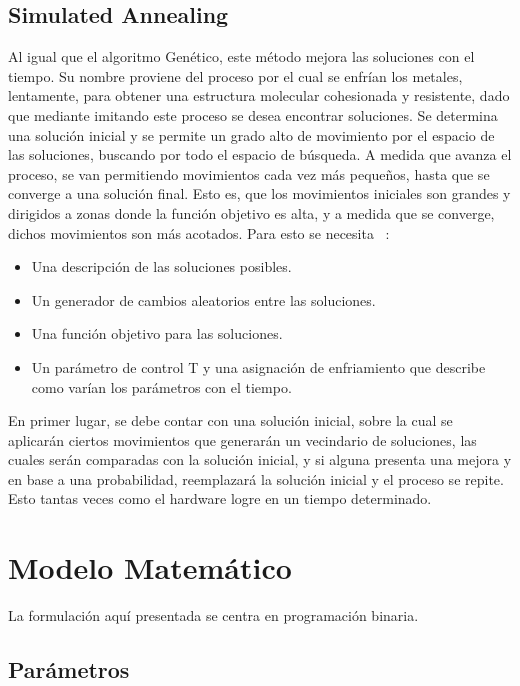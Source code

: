 \documentclass[letter, 10pt]{article}
\begin{document}
\subsection{Simulated Annealing}
Al igual que el algoritmo Gen\'etico, este m\'etodo mejora las soluciones con el tiempo. Su nombre proviene del proceso por el cual se enfr\'ian
los metales, lentamente, para obtener una estructura molecular cohesionada y resistente, dado que mediante imitando este proceso se desea encontrar
soluciones.
\newline
Se determina una soluci\'on inicial y se permite un grado alto de movimiento por el espacio de las soluciones, buscando por todo el espacio de 
b\'usqueda. A medida que avanza el proceso, se van permitiendo movimientos cada vez m\'as peque\~nos, hasta que se converge a una soluci\'on final. 
Esto es, que los movimientos iniciales son grandes y dirigidos a zonas donde la funci\'on objetivo es alta, y a medida que se converge, 
dichos movimientos son m\'as acotados.
Para esto se necesita ~\cite{whitepaper}:
\begin{itemize}
 \item Una descripci\'on de las soluciones posibles.
 \item Un generador de cambios aleatorios entre las soluciones.
 \item Una funci\'on objetivo para las soluciones.
 \item Un par\'ametro de control T y una asignaci\'on de enfriamiento que describe como var\'ian los par\'ametros con el tiempo.
\end{itemize}

En primer lugar, se debe contar con una soluci\'on inicial, sobre la cual se aplicar\'an ciertos movimientos que generar\'an un vecindario 
de soluciones, las cuales ser\'an comparadas con la soluci\'on inicial, y si alguna presenta una mejora y en base a una probabilidad, 
reemplazar\'a la soluci\'on inicial y el proceso se repite. Esto tantas veces como el hardware logre en un tiempo determinado.

\section{Modelo Matem\'atico}
La formulaci\'on aqu\'i presentada se centra en programaci\'on binaria.~\cite{RUTEO}

\subsection{Par\'ametros}
\end{document}
